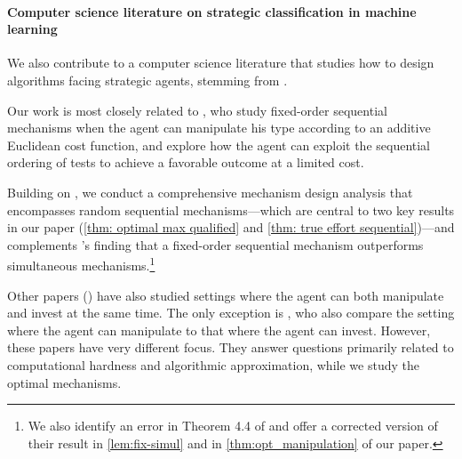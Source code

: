  
 \paragraph{Computer science literature on strategic classification in machine learning}
 We also contribute to a computer science literature that studies how to design algorithms facing strategic agents, stemming from \citet{hardt2016strategic}.
 
Our work is most closely related to  \citet{zigzag}, who study fixed-order sequential mechanisms when the agent can manipulate his type according to an additive Euclidean cost function, and explore how the agent can exploit the sequential ordering of tests to achieve a favorable outcome at a limited cost.

Building on \citet{zigzag}, we conduct a comprehensive mechanism design analysis that encompasses random sequential mechanisms---which are central to two key results in our paper (\cref{thm: optimal max qualified} and \cref{thm: true effort sequential})---and complements \citet{zigzag}'s finding that a fixed-order sequential mechanism outperforms simultaneous mechanisms.\footnote{We also identify an error in Theorem 4.4 of \citet{zigzag} and offer a corrected version of their result in \cref{lem:fix-simul} and in \cref{thm:opt_manipulation} of our paper.}
 
 Other papers (\citet{ahmadi2022classificationstrategicagentsgame,miller2020strategicclassificationcausalmodeling,haghtalab2020maximizingwelfareincentiveawareevaluation,kleinberg2019classifiersinduceagentsinvest}) have also studied settings where the agent can both manipulate and invest at the same time. 
 The only exception is \citet{ahmadi2022classificationstrategicagentsgame}, who also compare the setting where the agent can manipulate to that where the agent can invest. 
 However, these papers have very different focus. They answer questions primarily related to computational hardness and algorithmic approximation, while we study the optimal mechanisms.



